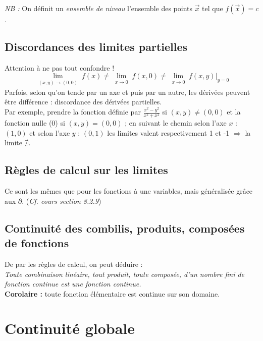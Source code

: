 \documentclass[11pt, a4paper, openany]{book}
\begin{document}
\textit{NB :} On définit un \textit{ensemble de niveau} l'ensemble des points $\vec{x}$ tel que $f(\vec{x}) = c$.

\subsection{Discordances des limites partielles}
Attention à ne pas tout confondre ! 
$$\lim\limits_{\substack{(x,y) \to (0,0)}} f(x) \neq \lim\limits_{\substack{x \to 0}} f(x,0)\neq \lim\limits_{\substack{x \to 0}} f(x,y)|_{y=0}$$
Parfois, selon qu'on tende par un axe et puis par un autre, les dérivées peuvent être différence : discordance des dérivées partielles.\\

Par exemple, prendre la fonction définie par $\frac{x^2 - y^2}{x^2+x^2}$ si $(x, y) \neq (0,0)$ et la fonction nulle ($0$) si $(x,y) = (0,0)$ ; en suivant le chemin selon l'axe $x$ : $(1,0)$ et selon l'axe $y$ : $(0,1)$ les limites valent respectivement 1 et -1 $\Rightarrow$ la limite $\nexists$.

\subsection{Règles de calcul sur les limites}
Ce sont les mêmes que pour les fonctions à une variables, mais généralisée grâce aux $\partial$. (\textit{Cf. cours section 8.2.9})

\subsection{Continuité des combilis, produits, composées de fonctions}
De par les règles de calcul, on peut déduire :\\
\textit{Toute combinaison linéaire, tout produit, toute composée, d'un nombre fini de fonction continue est une fonction continue.}\\
\textbf{Corolaire :} toute fonction élémentaire est continue sur son domaine.

\section{Continuité globale}
\end{document}
